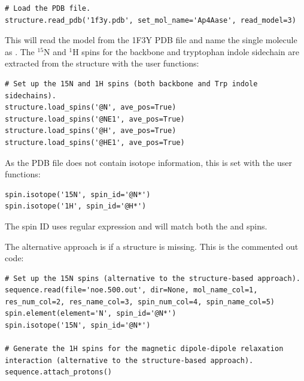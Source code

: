 \begin{htmlonly}
\begin{htmlonly}
\begin{lstlisting}[firstnumber=161]
# Load the PDB file.
structure.read_pdb('1f3y.pdb', set_mol_name='Ap4Aase', read_model=3)
\end{lstlisting}

This will read the  model from the 1F3Y PDB file and name the single molecule as .  The $^{15}$N and $^1$H spins for the backbone and tryptophan indole sidechain are extracted from the structure with the user functions:

\begin{lstlisting}[firstnumber=164]
# Set up the 15N and 1H spins (both backbone and Trp indole sidechains).
structure.load_spins('@N', ave_pos=True)
structure.load_spins('@NE1', ave_pos=True)
structure.load_spins('@H', ave_pos=True)
structure.load_spins('@HE1', ave_pos=True)
\end{lstlisting}

As the PDB file does not contain isotope information, this is set with the user functions:

\begin{lstlisting}[firstnumber=169]
spin.isotope('15N', spin_id='@N*')
spin.isotope('1H', spin_id='@H*')
\end{lstlisting}

The spin ID  uses regular expression and will match both the  and  spins.

The alternative approach is if a structure is missing.  This is the commented out code:

\begin{lstlisting}[firstnumber=172]
# Set up the 15N spins (alternative to the structure-based approach).
sequence.read(file='noe.500.out', dir=None, mol_name_col=1, res_num_col=2, res_name_col=3, spin_num_col=4, spin_name_col=5)
spin.element(element='N', spin_id='@N*')
spin.isotope('15N', spin_id='@N*')

# Generate the 1H spins for the magnetic dipole-dipole relaxation interaction (alternative to the structure-based approach).
sequence.attach_protons()
\end{lstlisting}


\end{htmlonly}
\end{htmlonly}
